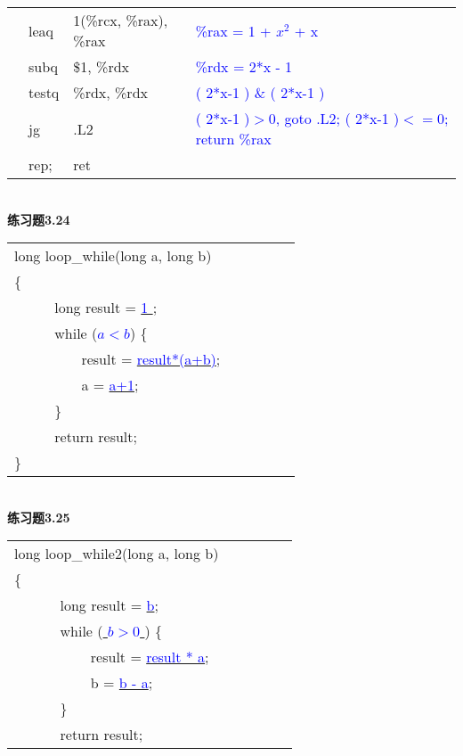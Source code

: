 \documentclass{article}
\newcommand{\blue}[1]{\textcolor{blue}{#1}}
\begin{document}
\begin{CJK}{UTF8}{uyhei}
\begin{table}[htbp]
\begin{tabular}{m{1em}m{3em}m{12em}l}
	&	leaq	&	1(\%rcx, \%rax), \%rax	&	\blue{\%rax = 1 + $x^2$ + x}	\\
	&	subq	&	\$1, \%rdx		&	\blue{\%rdx = 2*x - 1}	\\
	&	testq	&	\%rdx, \%rdx		&	\blue{( 2*x-1 ) \& ( 2*x-1 )}	\\
	&	jg	&	.L2			&	\blue{( 2*x-1 )$>$0, goto .L2; ( 2*x-1 )$<=0$; return \%rax }	\\
	&	rep;	&	ret			&	\blue{}	\\
\end{tabular}
\end{table}	\\
\textbf{练习题3.24}	\\[-3ex]
\begin{table}[ht]
\begin{tabular}{m{2em}m{2em}m{2em}l}
	\multicolumn{3}{l}{long loop\_while(long a, long b)}	\\
\{	\\
&	\multicolumn{3}{l}{ long result = \underline{\blue{ 1 }}; }	\\
&	\multicolumn{3}{l}{ while (\underline{\blue{$a<b$}}) \{ } 	\\
&	&	\multicolumn{2}{l}{result = \underline{\blue{result*(a+b)}};}	\\
&	&	\multicolumn{2}{l}{a = \underline{\blue{a+1}};}	\\
&	\multicolumn{3}{l}{\}}	\\
&	\multicolumn{3}{l}{return result;}	\\
\}	\\
\end{tabular}
\end{table}	\\
\textbf{练习题3.25}	\\[-3ex]
\begin{table}[ht]
\begin{tabular}{m{2em}m{2em}m{2em}l}
	\multicolumn{3}{l}{long loop\_while2(long a, long b)}	\\
\{	\\
	&	\multicolumn{3}{l}{ long result = \underline{\blue{b}}; }	\\
	&	\multicolumn{3}{l}{ while (\underline{\blue{ $b>0$ }}) \{ } 	\\
	&	&	\multicolumn{2}{l}{result = \underline{\blue{result * a}};}	\\
	&	&	\multicolumn{2}{l}{b = \underline{\blue{b - a}};}	\\
&	\multicolumn{3}{l}{\}}	\\
&	\multicolumn{3}{l}{return result;}	\\

\end{tabular}
\end{table}
\end{CJK}
\end{document}
